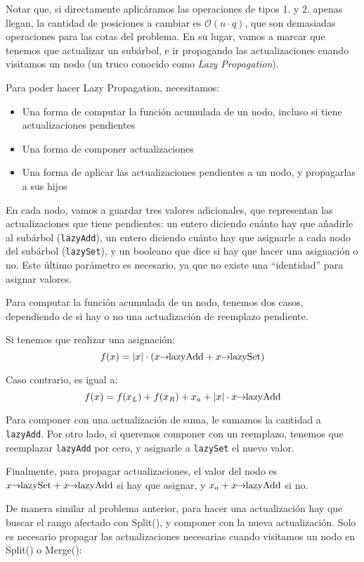 Notar que, si directamente aplicáramos las operaciones de tipos 1. y 2. apenas llegan,
la cantidad de posiciones a cambiar es \(\mathcal{O}(n \cdot q)\), que son demasiadas operaciones para las cotas del problema.
En su lugar, vamos a marcar que tenemos que actualizar un subárbol, e ir propagando las actualizaciones cuando visitamos un nodo (un truco conocido como \textit{Lazy Propagation}).

Para poder hacer Lazy Propagation, necesitamos:
\begin{itemize}
    \item Una forma de computar la función acumulada de un nodo, incluso si tiene actualizaciones pendientes
    \item Una forma de componer actualizaciones
    \item Una forma de aplicar las actualizaciones pendientes a un nodo, y propagarlas a sus hijos
\end{itemize}

En cada nodo, vamos a guardar tres valores adicionales, que representan las actualizaciones que tiene pendientes:
un entero diciendo cuánto hay que añadirle al subárbol (\texttt{lazyAdd}), un entero diciendo cuánto hay que asignarle a cada nodo del subárbol (\texttt{lazySet}), y un booleano que dice si hay que hacer una asignación o no. 
Este último parámetro es necesario, ya que no existe una ``identidad'' para asignar valores.

Para computar la función acumulada de un nodo, tenemos dos casos, dependiendo de si hay o no una actualización de reemplazo pendiente.

Si tenemos que realizar una asignación:
\[
f(x) = |x| \cdot (x \member{lazyAdd} + x \member{lazySet})
\]

Caso contrario, es igual a:
\[
f(x) = f(x_L) + f(x_R) + x_a + |x| \cdot x \!\!\rightarrow\!\! \text{lazyAdd}
\]

Para componer con una actualización de suma, le sumamos la cantidad a \texttt{lazyAdd}.
Por otro lado, si queremos componer con un reemplazo, tenemos que reemplazar \texttt{lazyAdd} por cero, y asignarle a \texttt{lazySet} el nuevo valor.

Finalmente, para propagar actualizaciones, el valor del nodo es \(x \member{lazySet} + x \member{lazyAdd} \) si hay que asignar, y \(x_a + x \!\!\rightarrow\!\! \text{lazyAdd}\) si no.

De manera similar al problema anterior, para hacer una actualización hay que buscar el rango afectado con Split(), y componer con la nueva actualización. 
Solo es necesario propagar las actualizaciones necesarias cuando visitamos un nodo en Split() o Merge():

